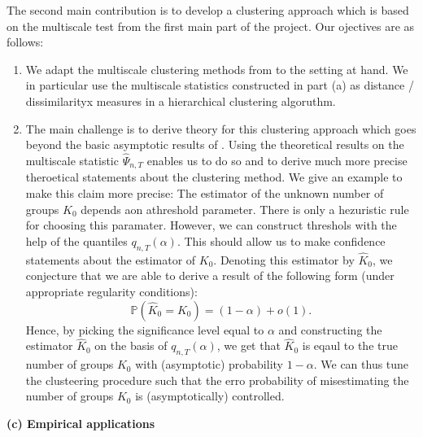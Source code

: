 \documentclass[a4paper,12pt]{article}
\begin{document}
\noindent The second main contribution is to develop a clustering approach which is based on the multiscale test from the first main part of the project. 
Our ojectives are as follows:
\begin{enumerate}[label=(\roman*),leftmargin=0.75cm]
\item We adapt the multiscale clustering methods from \cite{VogtLinton2018} to the setting at hand. We in particular use the multiscale statistics constructed in part (a) as distance / dissimilarityx measures in a hierarchical clustering algoruthm. 
\item  The main challenge is to derive theory for this clustering approach which goes beyond the basic asymptotic results of \cite{VogtLinton2018}. Using the theoretical results on the multiscale statistic $\hat{\Psi}_{n,T}$ enables us to do so and to derive much more precise theroetical statements about the clustering method. We give an example to make this claim more precise: The estimator of the unknown number of groups $K_0$ depends aon athreshold parameter. There is only a hezuristic rule for choosing this paramater. However, we can construct threshols with the help of the quantiles $q_{n,T}(\alpha)$. This should allow us to make confidence statements about the estimator of $K_0$. Denoting this estimator by $\hat{K}_0$, we conjecture that we are able to derive a result of the following form (under appropriate regularity conditions):
\[ \mathbb{P}( \hat{K}_0 = K_0 ) = (1-\alpha) + o(1). \] 
Hence, by picking the significance level equal to $\alpha$ and constructing the estimator $\hat{K}_0$ on the basis of $q_{n,T}(\alpha)$, we get that $\hat{K}_0$ is eqaul to the true number of groups $K_0$ with (asymptotic) probability $1-\alpha$. We can thus tune the clusteering procedure such that the erro probability of misestimating the number of groups $K_0$ is (asymptotically) controlled. 
\end{enumerate}
\vspace{5pt}


\noindent \textbf{(c) Empirical applications} 
\vspace{10pt}
\end{document}
